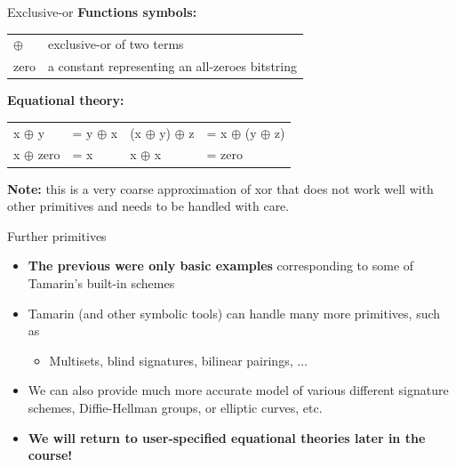 \documentclass[11pt,aspectratio=169]{beamer}
\begin{document}
\begin{frame}[fragile]{Exclusive-or}
    \textbf{Functions symbols:}
    \begin{table}[]
        \raggedright
        \begin{tabular}{ll}
            \textcolor{TermBlue}{$\oplus$} & exclusive-or of two terms \\
            \textcolor{TermBlue}{zero}
                & a constant representing an all-zeroes bitstring \\
        \end{tabular}
    \end{table}

    \textbf{Equational theory:}
    \begin{table}[]
        \raggedright
        {\color{TermBlue}
        \begin{tabular}{ll @{\hskip .8in} ll}
             x $\oplus$ y & = y $\oplus$ x &
            (x $\oplus$ y) $\oplus$ z & = x $\oplus$ (y $\oplus$ z) \\
             x $\oplus$ zero & = x &
             x $\oplus$ x & = zero
        \end{tabular}}
    \end{table}

    \textbf{Note:} this is a very coarse approximation of xor that does not 
        work well with other primitives and needs to be handled with care.
\end{frame}

\begin{frame}[fragile]{Further primitives}
    \begin{itemize}
        \item \textbf{The previous were only basic examples} corresponding to 
              some of Tamarin's built-in schemes
        \item Tamarin (and other symbolic tools) can handle many more 
              primitives, such as
        \begin{itemize}
            \item Multisets, blind signatures, bilinear pairings, $\dots$
        \end{itemize}
        \item We can also provide much more accurate model of various different 
              signature schemes, Diffie-Hellman groups, or elliptic curves, etc.
        \item \textbf{We will return to user-specified equational theories 
                      later in the course!}
    \end{itemize}
\end{frame}
\end{document}
